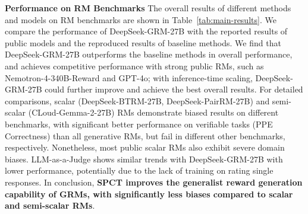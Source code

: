 \documentclass{article} %
\newcommand{\SGRM}{DeepSeek-GRM-27B\xspace}
\newcommand{\BTRM}{DeepSeek-BTRM\xspace}
\newcommand{\PairRM}{DeepSeek-PairRM\xspace}
\begin{document}
\noindent\textbf{Performance on RM Benchmarks}
The overall results of different methods and models on RM benchmarks are shown in Table~\ref{tab:main-results}. We compare the performance of \SGRM with the reported results of public models and the reproduced results of baseline methods. We find that \SGRM outperforms the baseline methods in overall performance, and achieves competitive performance with strong public RMs, such as Nemotron-4-340B-Reward and GPT-4o; with inference-time scaling, \SGRM could further improve and achieve the best overall results. For detailed comparisons, scalar (\BTRM-27B, \PairRM-27B) and semi-scalar (CLoud-Gemma-2-27B) RMs demonstrate biased results on different benchmarks, with significant better performance on verifiable tasks (PPE Correctness) than all generative RMs, but fail in different other benchmarks, respectively. Nonetheless, most public scalar RMs also exhibit severe domain biases. LLM-as-a-Judge shows similar trends with \SGRM with lower performance, potentially due to the lack of training on rating single responses. In conclusion, \textbf{SPCT improves the generalist reward generation capability of GRMs, with significantly less biases compared to scalar and semi-scalar RMs}. 
\end{document}
